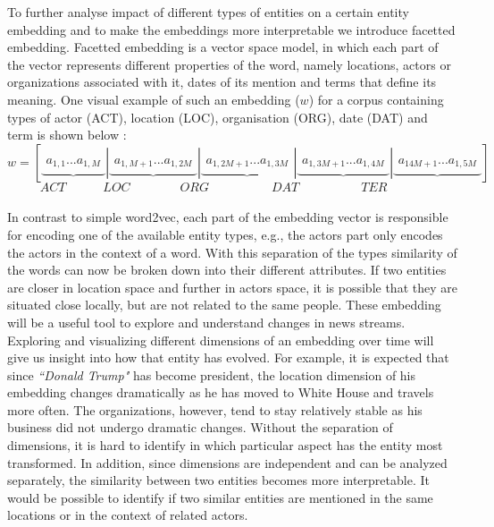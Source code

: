 \noindent
To further analyse impact of different types of entities on a certain entity embedding and to make the embeddings more interpretable we introduce facetted embedding. Facetted embedding is a vector space model, in which each part of the vector represents different properties of the word, namely locations, actors or organizations associated with it, dates of its mention and terms that define its meaning. One visual example of such an embedding ($w$) for a corpus containing types of actor (ACT), location (LOC), organisation (ORG), date (DAT) and term is shown below : \\
\mathleft
\begin{equation}
w=\left[ \underbrace { \begin{matrix}{ a }_{ 1,1 } ... { a }_{ 1,M } \end{matrix} } |\underbrace { \begin{matrix}{ a }_{ 1,M+1 } ... { a }_{ 1,2M } \end{matrix} } |\underbrace { \begin{matrix}{ a }_{ 1,2M+1 } ... { a }_{ 1,3M } \end{matrix} } |\underbrace { \begin{matrix}{ a }_{ 1,3M+1 } ... { a }_{ 1,4M } \end{matrix} } |\underbrace { \begin{matrix}{ a }_{ 14M+1 } ... { a }_{ 1,5M } \end{matrix} }  \right] 
\label{eq:concat_vec}
\end{equation}
$$ \quad  ACT \quad  \qquad  LOC\qquad \qquad ORG\qquad \quad \qquad DAT\qquad \quad  \qquad  TER\qquad \qquad$$
\mathcenter
\\
In contrast to simple word2vec, each part of the embedding vector is responsible for encoding one of the available entity types, e.g., the actors part only encodes the actors in the context of a word. With this separation of the types similarity of the words can now be broken down into their different attributes. If two entities are closer in location space and further in actors space, it is possible that they are situated close locally, but are not related to the same people. These embedding will be a useful tool to explore and understand changes in news streams. Exploring and visualizing different dimensions of an embedding over time will give us insight into how that entity has evolved. For example, it is expected that since \emph{``Donald Trump"} has become president, the location dimension of his embedding changes dramatically as he has moved to White House and travels more often. The organizations, however, tend to stay relatively stable as his business did not undergo dramatic changes. Without the separation of dimensions, it is hard to identify in which particular aspect has the entity most transformed. In addition, since dimensions are independent and can be analyzed separately, the similarity between two entities becomes more interpretable. It would be possible to identify if two similar entities are mentioned in the same locations or in the context of related actors.  \\

